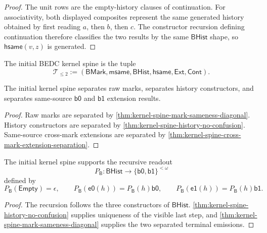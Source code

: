 \begin{proof}
The unit rows are the empty-history clauses of continuation.  For
associativity, both displayed composites represent the same generated
history obtained by first reading $a$, then $b$, then $c$.  The
constructor recursion defining continuation therefore classifies the two
results by the same $\mathsf{BHist}$ shape, so $\mathsf{hsame}(v,z)$ is
generated.
\end{proof}

\begin{definition}
\label{def:initial-kernel-spine}
The initial BEDC kernel spine is the tuple
$$
\mathcal T_{\leq 2}
:=
(\mathsf{BMark},\mathsf{msame},
\mathsf{BHist},\mathsf{hsame},
\mathsf{Ext},\mathsf{Cont}).
$$
\end{definition}

\begin{theorem}
\label{thm:initial-kernel-spine-separation}
The initial kernel spine separates raw marks, separates history
constructors, and separates same-source $\mathsf{b0}$ and $\mathsf{b1}$
extension results.
\end{theorem}

\begin{proof}
Raw marks are separated by
\autoref{thm:kernel-spine-mark-sameness-diagonal}.  History constructors
are separated by \autoref{thm:kernel-spine-history-no-confusion}.
Same-source cross-mark extensions are separated by
\autoref{thm:kernel-spine-cross-mark-extension-separation}.
\end{proof}

\begin{corollary}
\label{cor:kernel-spine-minimal-binary-recursive-readout}
The initial kernel spine supports the recursive readout
$$
P_{\mathsf{B}}:\mathsf{BHist}\to
\{\mathsf{b0},\mathsf{b1}\}^{<\omega}
$$
defined by
$$
P_{\mathsf{B}}(\mathsf{Empty})=\epsilon,
\qquad
P_{\mathsf{B}}(\mathsf{e0}(h))=P_{\mathsf{B}}(h)\mathsf{b0},
\qquad
P_{\mathsf{B}}(\mathsf{e1}(h))=P_{\mathsf{B}}(h)\mathsf{b1}.
$$
\end{corollary}

\begin{proof}
The recursion follows the three constructors of $\mathsf{BHist}$.
\autoref{thm:kernel-spine-history-no-confusion} supplies uniqueness of the
visible last step, and \autoref{thm:kernel-spine-mark-sameness-diagonal}
supplies the two separated terminal emissions.
\end{proof}

